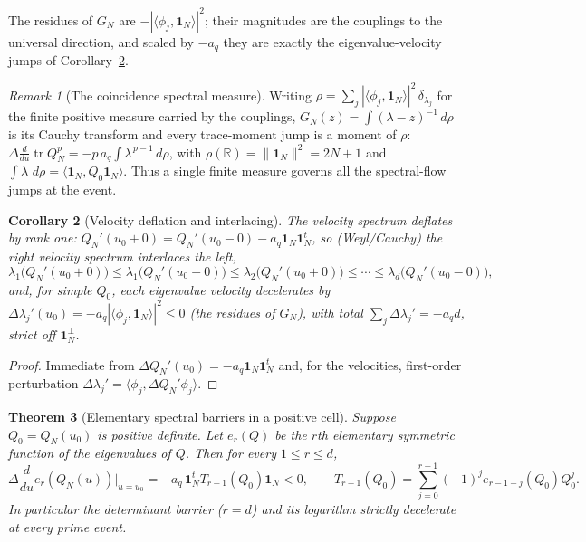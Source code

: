 \documentclass[11pt]{article}
\theoremstyle{plain}
\newtheorem{theorem}{Theorem}[section]
\newtheorem{corollary}[theorem]{Corollary}
\theoremstyle{definition}
\theoremstyle{remark}
\newtheorem{remark}[theorem]{Remark}
\newcommand{\R}{\mathbb R}
\newcommand{\dd}{\,d}
\newcommand{\one}{\mathbf 1}
\begin{document}
The residues of $G_N$ are $-|\langle\phi_j,\one_N\rangle|^2$; their magnitudes are
the couplings to the universal direction, and scaled by $-a_q$ they are exactly
the eigenvalue-velocity jumps of Corollary~\ref{cor:deflation}.

\begin{remark}[The coincidence spectral measure]
Writing $\rho=\sum_j|\langle\phi_j,\one_N\rangle|^2\,\delta_{\lambda_j}$ for the
finite positive measure carried by the couplings, $G_N(z)=\int(\lambda-z)^{-1}\dd\rho$
is its Cauchy transform and every trace-moment jump is a moment of $\rho$:
$\Delta\frac{d}{du}\operatorname{tr}Q_N^p=-p\,a_q\int\lambda^{\,p-1}\dd\rho$, with
$\rho(\R)=\|\one_N\|^2=2N+1$ and $\int\lambda\,\dd\rho=\langle\one_N,Q_0\one_N\rangle$.
Thus a single finite measure governs all the spectral-flow jumps at the event.
\end{remark}

\begin{corollary}[Velocity deflation and interlacing]\label{cor:deflation}
The velocity spectrum deflates by rank one: $Q_N'(u_0{+}0)=Q_N'(u_0{-}0)
-a_q\one_N\one_N^t$, so (Weyl/Cauchy) the right velocity spectrum interlaces the
left,
\[
 \lambda_1\!\bigl(Q_N'(u_0{+}0)\bigr)\le\lambda_1\!\bigl(Q_N'(u_0{-}0)\bigr)
 \le\lambda_2\!\bigl(Q_N'(u_0{+}0)\bigr)\le\cdots
 \le\lambda_d\!\bigl(Q_N'(u_0{-}0)\bigr),
\]
and, for simple $Q_0$, each eigenvalue velocity decelerates by
$\Delta\lambda_j'(u_0)=-a_q|\langle\phi_j,\one_N\rangle|^2\le0$ (the residues of
$G_N$), with total $\sum_j\Delta\lambda_j'=-a_qd$, strict off
$\one_N^{\perp}$.
\end{corollary}

\begin{proof}
Immediate from $\Delta Q_N'(u_0)=-a_q\one_N\one_N^t$ and, for the velocities,
first-order perturbation $\Delta\lambda_j'=\langle\phi_j,\Delta Q_N'\phi_j\rangle$.
\end{proof}

\begin{theorem}[Elementary spectral barriers in a positive cell]\label{thm:barriers}
Suppose $Q_0=Q_N(u_0)$ is positive definite. Let $e_r(Q)$ be the $r$th elementary
symmetric function of the eigenvalues of $Q$. Then for every $1\le r\le d$,
\[
        \Delta\frac{d}{du}e_r(Q_N(u))\Big|_{u=u_0}
        =-a_q\,\one_N^tT_{r-1}(Q_0)\one_N<0,\qquad
        T_{r-1}(Q_0)=\sum_{j=0}^{r-1}(-1)^je_{r-1-j}(Q_0)Q_0^j .
\]
In particular the determinant barrier ($r=d$) and its logarithm strictly
decelerate at every prime event.
\end{theorem}
\end{document}
